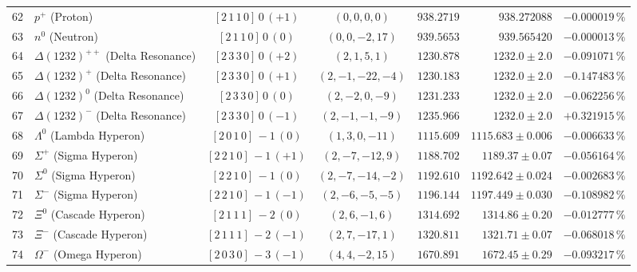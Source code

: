 \documentclass[
    12pt,
    a4paper,
    headings=normal,
    twoside=false,
    open=any,
    parskip=half
]{scrbook}
\begin{document}
\begin{longtable}{clccrrr}
\rowcolor{secondarycolor!8}
62 & $p^+$ (Proton) & $[2 \, 1 \, 1 \, 0] \, 0 \, (+1)$ & $(0, 0, 0, 0)$ & $938.2719$ & $938.272088$ & $-0.000019\,\%$ \\
\rowcolor{secondarycolor!8}
63 & $n^0$ (Neutron) & $[2 \, 1 \, 1 \, 0] \, 0 \, (0)$ & $(0, 0, -2, 17)$ & $939.5653$ & $939.565420$ & $-0.000013\,\%$ \\
\rowcolor{secondarycolor!8}
64 & $\Delta(1232)^{++}$ (Delta Resonance) & $[2 \, 3 \, 3 \, 0] \, 0 \, (+2)$ & $(2, 1, 5, 1)$ & $1230.878$ & $1232.0 \pm 2.0$ & $-0.091071\,\%$ \\
\rowcolor{secondarycolor!8}
65 & $\Delta(1232)^+$ (Delta Resonance) & $[2 \, 3 \, 3 \, 0] \, 0 \, (+1)$ & $(2, -1, -22, -4)$ & $1230.183$ & $1232.0 \pm 2.0$ & $-0.147483\,\%$ \\
\rowcolor{secondarycolor!8}
66 & $\Delta(1232)^0$ (Delta Resonance) & $[2 \, 3 \, 3 \, 0] \, 0 \, (0)$ & $(2, -2, 0, -9)$ & $1231.233$ & $1232.0 \pm 2.0$ & $-0.062256\,\%$ \\
\rowcolor{secondarycolor!8}
67 & $\Delta(1232)^-$ (Delta Resonance) & $[2 \, 3 \, 3 \, 0] \, 0 \, (-1)$ & $(2, -1, -1, -9)$ & $1235.966$ & $1232.0 \pm 2.0$ & $+0.321915\,\%$ \\
\rowcolor{secondarycolor!8}
68 & $\Lambda^0$ (Lambda Hyperon) & $[2 \, 0 \, 1 \, 0] \, -1 \, (0)$ & $(1, 3, 0, -11)$ & $1115.609$ & $1115.683 \pm 0.006$ & $-0.006633\,\%$ \\
\rowcolor{secondarycolor!8}
69 & $\Sigma^+$ (Sigma Hyperon) & $[2 \, 2 \, 1 \, 0] \, -1 \, (+1)$ & $(2, -7, -12, 9)$ & $1188.702$ & $1189.37 \pm 0.07$ & $-0.056164\,\%$ \\
\rowcolor{secondarycolor!8}
70 & $\Sigma^0$ (Sigma Hyperon) & $[2 \, 2 \, 1 \, 0] \, -1 \, (0)$ & $(2, -7, -14, -2)$ & $1192.610$ & $1192.642 \pm 0.024$ & $-0.002683\,\%$ \\
\rowcolor{secondarycolor!8}
71 & $\Sigma^-$ (Sigma Hyperon) & $[2 \, 2 \, 1 \, 0] \, -1 \, (-1)$ & $(2, -6, -5, -5)$ & $1196.144$ & $1197.449 \pm 0.030$ & $-0.108982\,\%$ \\
\rowcolor{secondarycolor!8}
72 & $\Xi^0$ (Cascade Hyperon) & $[2 \, 1 \, 1 \, 1] \, -2 \, (0)$ & $(2, 6, -1, 6)$ & $1314.692$ & $1314.86 \pm 0.20$ & $-0.012777\,\%$ \\
\rowcolor{secondarycolor!8}
73 & $\Xi^-$ (Cascade Hyperon) & $[2 \, 1 \, 1 \, 1] \, -2 \, (-1)$ & $(2, 7, -17, 1)$ & $1320.811$ & $1321.71 \pm 0.07$ & $-0.068018\,\%$ \\
\rowcolor{secondarycolor!8}
74 & $\Omega^-$ (Omega Hyperon) & $[2 \, 0 \, 3 \, 0] \, -3 \, (-1)$ & $(4, 4, -2, 15)$ & $1670.891$ & $1672.45 \pm 0.29$ & $-0.093217\,\%$ \\\midrule

\end{longtable}
\end{document}
